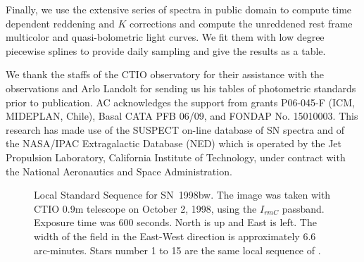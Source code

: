 \documentclass[12pt,preprint]{aastex}
\begin{document}
Finally, we use the extensive series of spectra in public domain to compute time dependent reddening and $K$ corrections and compute
the unreddened rest frame multicolor and quasi-bolometric light curves. We fit them with low degree piecewise splines to provide daily sampling
and give the results as a table.

\acknowledgments

We thank the staffs of the CTIO observatory for their assistance with the observations and
Arlo Landolt for sending us his tables of photometric standards prior to publication.
%
AC acknowledges the support from grants P06-045-F (ICM, MIDEPLAN, Chile), Basal CATA PFB 06/09, and FONDAP No. 15010003.
%
This research has made use of the SUSPECT on-line database of SN spectra and of the NASA/IPAC
Extragalactic Database (NED) which is operated by the Jet Propulsion Laboratory, California Institute
of Technology, under contract with the National Aeronautics and Space Administration.

\begin{thebibliography}{}

\end{thebibliography}

\newpage

\begin{figure}[t]
\caption{Local Standard Sequence for SN~1998bw. The image was taken with CTIO 0.9m telescope on
October 2, 1998, using the $I_{rm C}$ passband. Exposure time was 600 seconds.
%
North is up and East  is left. The width of the field in the East-West direction
is approximately 6.6 arc-minutes.
%
Stars number 1 to 15 are the same local sequence of \citet{getal98}.
\label{fi:sequence}}
\end{figure}

\clearpage
\end{document}
